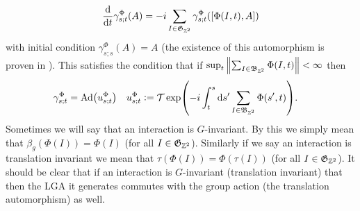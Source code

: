 \documentclass[12pt,a4paper,twoside]{article}
\numberwithin{equation}{section}
\begin{document}
\begin{equation}
	\frac{\text{d}}{\text{d} t}\gamma^{\Phi}_{s;t}(A)=-i\sum_{I\in\mathfrak{G}_{\mathbb Z^2}}\gamma^{\Phi}_{s;t}([\Phi(I,t),A])
\end{equation}
with initial condition $\gamma^{\Phi}_{s;s}(A)=A$ (the existence of this automorphism is proven in \cite{doi:10.1063/1.5095769}). This satisfies the condition that if $\sup_t\norm{\sum_{I\in\mathfrak{B}_{\mathbb Z^2}}\Phi(I,t)}<\infty$ then
\begin{align}
	\gamma^\Phi_{s;t}&=\Ad{u^\Phi_{s;t}}&u^\Phi_{s;t}&\defeq\mathcal{T}\exp(-i\int_t^s\d s'\sum_{I\in\mathfrak{B}_{\ZZ^2}}\Phi(s',t)).
\end{align}
Sometimes we will say that an interaction is $G$-invariant. By this we simply mean that $\beta_g(\Phi(I))=\Phi(I)$ (for all $I\in\mathfrak{G}_{\mathbb Z^2}$). Similarly if we say an interaction is translation invariant we mean that $\tau(\Phi(I))=\Phi(\tau(I))$ (for all $I\in\mathfrak{G}_{\mathbb Z^2}$). It should be clear that if an interaction is $G$-invariant (translation invariant) that then the LGA it generates commutes with the group action (the translation automorphism) as well.
\end{document}
